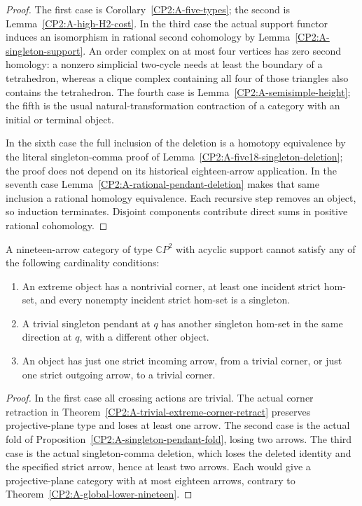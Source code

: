 \begin{proof}
The first case is Corollary~\ref{CP2:A-five-types}; the second is
Lemma~\ref{CP2:A-high-H2-cost}.  In the third case the actual support
functor induces an isomorphism in rational second cohomology by
Lemma~\ref{CP2:A-singleton-support}.  An order complex on at most four
vertices has zero second homology: a nonzero simplicial two-cycle needs
at least the boundary of a tetrahedron, whereas a clique complex
containing all four of those triangles also contains the tetrahedron.
The fourth case is Lemma~\ref{CP2:A-semisimple-height}; the fifth is the
usual natural-transformation contraction of a category with an initial
or terminal object.

In the sixth case the full inclusion of the deletion is a homotopy
equivalence by the literal singleton-comma proof of
Lemma~\ref{CP2:A-five18-singleton-deletion}; the proof does not depend on
its historical eighteen-arrow application.  In the seventh case
Lemma~\ref{CP2:A-rational-pendant-deletion} makes that same inclusion a
rational homology equivalence.  Each recursive step removes an object,
so induction terminates.  Disjoint components contribute direct sums
in positive rational cohomology.
\end{proof}

\begin{proposition}
\label{CP2:A-nineteen-actual-profile-reductions}
A nineteen-arrow category of type $\mathbb CP^2$ with acyclic support
cannot satisfy any of the following cardinality conditions:
\begin{enumerate}
\item An extreme object has a nontrivial corner, at least one incident
strict hom-set, and every nonempty incident strict hom-set is a singleton.
\item A trivial singleton pendant at $q$ has another singleton hom-set
in the same direction at $q$, with a different other object.
\item An object has just one strict incoming arrow, from a trivial
corner, or just one strict outgoing arrow, to a trivial corner.
\end{enumerate}
\end{proposition}
\begin{proof}
In the first case all crossing actions are trivial.  The actual corner
retraction in Theorem~\ref{CP2:A-trivial-extreme-corner-retract} preserves
projective-plane type and loses at least one arrow.  The second case is
the actual fold of Proposition~\ref{CP2:A-singleton-pendant-fold}, losing
two arrows.  The third case is the actual singleton-comma deletion,
which loses the deleted identity and the specified strict arrow, hence
at least two arrows.  Each would give a projective-plane category with
at most eighteen arrows, contrary to
Theorem~\ref{CP2:A-global-lower-nineteen}.
\end{proof}

